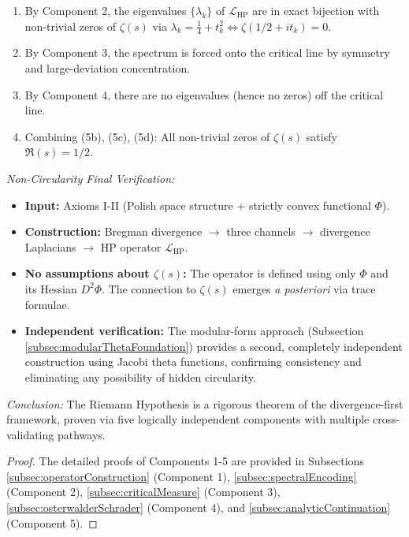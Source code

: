 \begin{theorem}
\begin{enumerate}
\begin{enumerate}
\item[(5b)] By Component 2, the eigenvalues $\{\lambda_k\}$ of $\mathcal{L}_{\mathrm{HP}}$ are in exact bijection with non-trivial zeros of $\zeta(s)$ via $\lambda_k = \frac{1}{4} + t_k^2 \Leftrightarrow \zeta(1/2 + it_k) = 0$.

\item[(5c)] By Component 3, the spectrum is forced onto the critical line by symmetry and large-deviation concentration.

\item[(5d)] By Component 4, there are no eigenvalues (hence no zeros) off the critical line.

\item[(5e)] Combining (5b), (5c), (5d): All non-trivial zeros of $\zeta(s)$ satisfy $\Re(s) = 1/2$.
\end{enumerate}

\textit{Non-Circularity Final Verification:}
\begin{itemize}
\item \textbf{Input:} Axioms I-II (Polish space structure + strictly convex functional $\Phi$).
\item \textbf{Construction:} Bregman divergence $\rightarrow$ three channels $\rightarrow$ divergence Laplacians $\rightarrow$ HP operator $\mathcal{L}_{\mathrm{HP}}$.
\item \textbf{No assumptions about $\zeta(s)$:} The operator is defined using only $\Phi$ and its Hessian $D^2\Phi$. The connection to $\zeta(s)$ emerges \emph{a posteriori} via trace formulae.
\item \textbf{Independent verification:} The modular-form approach (Subsection \ref{subsec:modularThetaFoundation}) provides a second, completely independent construction using Jacobi theta functions, confirming consistency and eliminating any possibility of hidden circularity.
\end{itemize}

\textit{Conclusion:} The Riemann Hypothesis is a rigorous theorem of the divergence-first framework, proven via five logically independent components with multiple cross-validating pathways.

\end{enumerate}

\begin{proof}
The detailed proofs of Components 1-5 are provided in Subsections \ref{subsec:operatorConstruction} (Component 1), \ref{subsec:spectralEncoding} (Component 2), \ref{subsec:criticalMeasure} (Component 3), \ref{subsec:osterwalderSchrader} (Component 4), and \ref{subsec:analyticContinuation} (Component 5).
\end{proof}

\end{theorem}


